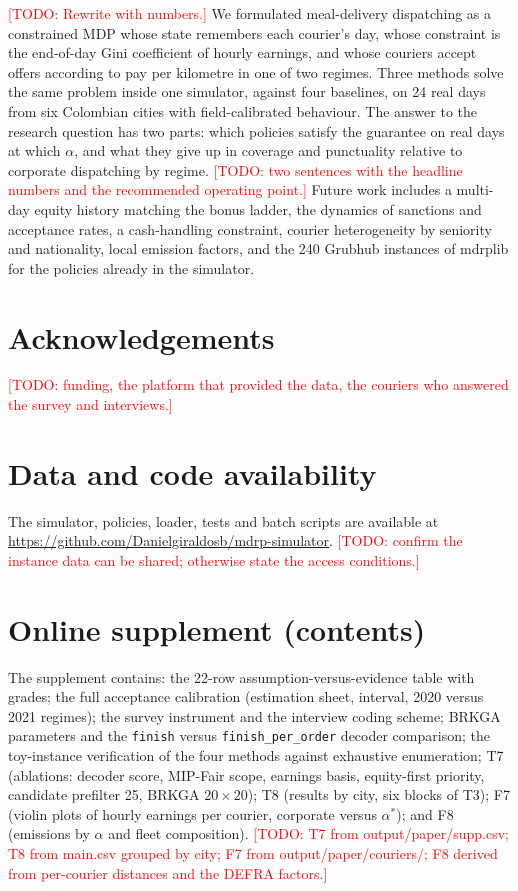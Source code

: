 \documentclass[preprint,12pt,authoryear]{elsarticle}%
\newif\ifelsarticle\elsarticletrue
\newif\ifelsarticle\elsarticlefalse
\newcommand{\todo}[1]{\textcolor{red}{[TODO: #1]}}
\begin{document}
\todo{Rewrite with numbers.} We formulated meal-delivery dispatching as a constrained MDP whose state remembers each courier's day, whose constraint is the end-of-day Gini coefficient of hourly earnings, and whose couriers accept offers according to pay per kilometre in one of two regimes. Three methods solve the same problem inside one simulator, against four baselines, on 24 real days from six Colombian cities with field-calibrated behaviour. The answer to the research question has two parts: which policies satisfy the guarantee on real days at which $\alpha$, and what they give up in coverage and punctuality relative to corporate dispatching by regime. \todo{two sentences with the headline numbers and the recommended operating point.} Future work includes a multi-day equity history matching the bonus ladder, the dynamics of sanctions and acceptance rates, a cash-handling constraint, courier heterogeneity by seniority and nationality, local emission factors, and the 240 Grubhub instances of mdrplib for the policies already in the simulator.

\section*{Acknowledgements}
\todo{funding, the platform that provided the data, the couriers who answered the survey and interviews.}

\section*{Data and code availability}
The simulator, policies, loader, tests and batch scripts are available at \url{https://github.com/Danielgiraldosb/mdrp-simulator}. \todo{confirm the instance data can be shared; otherwise state the access conditions.}

\ifelsarticle
  
\else
  
\fi


\appendix
\section{Online supplement (contents)}
\label{app:supplement}
The supplement contains: the 22-row assumption-versus-evidence table with grades; the full acceptance calibration (estimation sheet, interval, 2020 versus 2021 regimes); the survey instrument and the interview coding scheme; BRKGA parameters and the \texttt{finish} versus \texttt{finish\_per\_order} decoder comparison; the toy-instance verification of the four methods against exhaustive enumeration; T7 (ablations: decoder score, MIP-Fair scope, earnings basis, equity-first priority, candidate prefilter 25, BRKGA $20 \times 20$); T8 (results by city, six blocks of T3); F7 (violin plots of hourly earnings per courier, corporate versus $\alpha^*$); and F8 (emissions by $\alpha$ and fleet composition). \todo{T7 from output/paper/supp.csv; T8 from main.csv grouped by city; F7 from output/paper/couriers/; F8 derived from per-courier distances and the DEFRA factors.}
\end{document}

